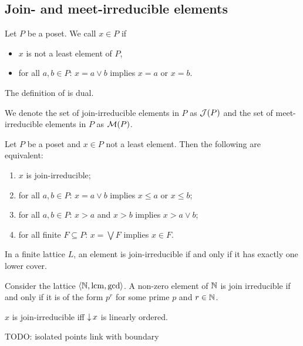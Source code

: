 \subsection{Join- and meet-irreducible elements}
\begin{definition}
Let $P$ be a poset. We call $x\in P$  if
\begin{itemize}
\item $x$ is not a least element of $P$,
\item for all $a,b\in P$: $x= a\vee b$ implies $x=a$ or $x=b$.
\end{itemize}
The definition of  is dual.

We denote the set of join-irreducible elements in $P$ as $\operatorname{\mathcal{J}}(P)$ and the set of meet-irreducible elements in $P$ as $\operatorname{\mathcal{M}}(P)$.
\end{definition}

\begin{lemma} \label{joinIrreducibleLemma}
Let $P$ be a poset and $x\in P$ not a least element. Then the following are equivalent:
\begin{enumerate}
\item $x$ is join-irreducible;
\item for all $a,b\in P$: $x= a\vee b$ implies $x \leq a$ or $x \leq b$;
\item for all $a,b\in P$: $x > a$ and $x > b$ implies $x > a\vee b$;
\item for all finite $F\subseteq P$: $x = \bigvee F$ implies $x\in F$.
\end{enumerate}
\end{lemma}

\begin{lemma}
In a finite lattice $L$, an element is join-irreducible if and only if it
has exactly one lower cover.
\end{lemma}

\begin{example}
Consider the lattice $\left\langle \mathbb{N},\operatorname{lcm}, \gcd \right\rangle$. A non-zero element of $\mathbb{N}$ is join irreducible if and only if it is of the form $p^r$ for some prime $p$ and $r\in\mathbb{N}$.
\end{example}

\begin{proposition}
$x$ is join-irreducible iff $\operatorname{\downarrow} x$ is linearly ordered.
\end{proposition}

TODO: isolated points
link with boundary

